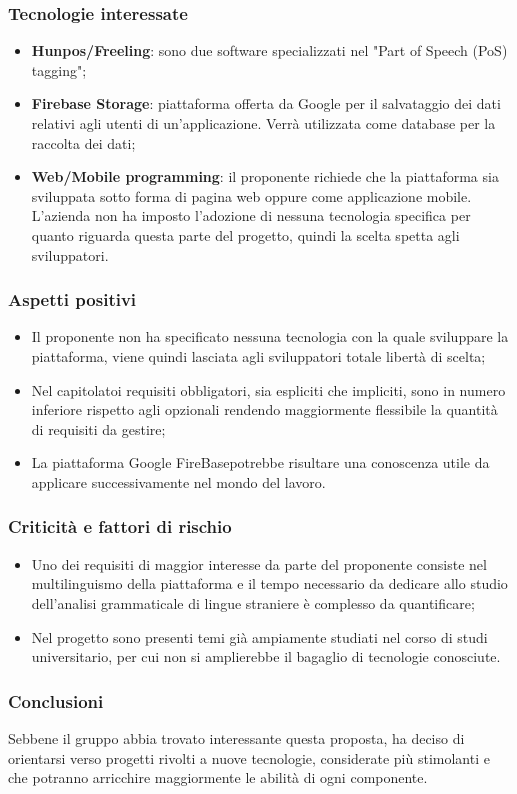 \subsubsection{Tecnologie interessate}
\begin{itemize}
	\item \textbf{Hunpos\glo/Freeling\glo}: sono due software specializzati nel "Part
	of Speech (PoS) tagging"\glo;
	
	\item \textbf{Firebase Storage\glo}: piattaforma offerta da Google per il salvataggio dei dati relativi agli utenti di un'applicazione. Verrà utilizzata come database per la raccolta dei dati;
	 
	\item \textbf{Web/Mobile programming}: il proponente richiede che la
	piattaforma sia sviluppata sotto forma di pagina web oppure come
	applicazione mobile. L'azienda non ha imposto l'adozione di nessuna
	tecnologia specifica per quanto riguarda questa parte del progetto, quindi
	la scelta spetta agli sviluppatori.		
\end{itemize}
\subsubsection{Aspetti positivi}
\begin{itemize}
	\item Il proponente non ha specificato nessuna tecnologia con la quale
	 sviluppare la piattaforma, viene quindi lasciata agli sviluppatori totale
	 libertà di scelta;
	\item Nel capitolato\glosp i requisiti obbligatori, sia espliciti che impliciti,
	 sono in numero inferiore rispetto agli opzionali rendendo maggiormente
	 flessibile la quantità di requisiti da gestire;
	\item La piattaforma Google FireBase\glosp potrebbe risultare una conoscenza
	 utile da applicare successivamente nel mondo del lavoro.
	
\end{itemize}

\subsubsection{Criticità e fattori di rischio}

\begin{itemize}
	\item Uno dei requisiti di maggior interesse da parte del
	 proponente consiste nel multilinguismo della piattaforma e il tempo
	 necessario da dedicare allo studio dell'analisi grammaticale di lingue straniere è
	 complesso da quantificare;
	
	\item Nel progetto sono presenti temi già ampiamente studiati nel corso di
	 studi universitario, per cui non si amplierebbe il bagaglio di
	 tecnologie conosciute.
 	
\end{itemize}
\subsubsection{Conclusioni}
Sebbene il gruppo abbia trovato interessante questa proposta, ha deciso
di orientarsi verso progetti rivolti a nuove tecnologie, considerate più
stimolanti e che potranno arricchire maggiormente le abilità di ogni 
componente. 


